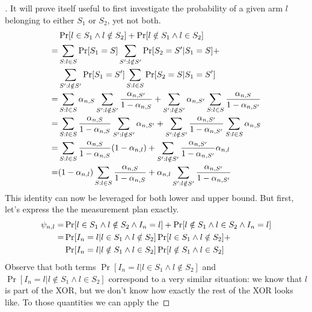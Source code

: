 \begin{proof}[]
  It will prove itself useful to first investigate the probability of a given
  arm $l$ belonging to either $S_1$ or $S_2$, yet not both.
  \begin{align}
    &\Pr[l \in S_1 \wedge l \notin S_2] + \Pr[l \notin S_1 \wedge l \in S_2]  \\
    =& \sum_{S: l \in S} \Pr[S_1 = S] \sum_{S': l \notin S'} \Pr[S_2 = S' | S_1
        = S] + \notag\\
    & \sum_{S': l \notin S'} \Pr[S_1 = S'] \sum_{S: l \in S} \Pr[S_2 = S | S_1
        = S'] \\
    =& \sum_{S: l \in S} \alpha_{n, S} \sum_{S': l \notin S'} \frac{\alpha_{n,
        S'}}{1 - \alpha_{n, S}} + \sum_{S': l \notin S'} \alpha_{n, S'}
        \sum_{S: l \in S} \frac{\alpha_{n, S}}{1 - \alpha_{n, S'}}\\
    =& \sum_{S: l \in S} \frac{\alpha_{n, S}}{1 - \alpha_{n, S}} \sum_{S': l
        \notin S'} \alpha_{n, S'} + \sum_{S': l \notin S'} \frac{\alpha_{n,
        S'}}{1 - \alpha_{n, S'}} \sum_{S: l \in S} \alpha_{n, S}\\
    =& \sum_{S: l \in S} \frac{\alpha_{n, S}}{1 - \alpha_{n, S}} (1 -
        \alpha_{n, l}) +  \sum_{S': l \notin S'} \frac{\alpha_{n, S'}}{1 -
        \alpha_{n, S'}} \alpha_{n, l} \\
    =& (1 - \alpha_{n, l})\sum_{S: l \in S} \frac{\alpha_{n, S}}{1 - \alpha_{n,
        S}} + \alpha_{n, l} \sum_{S': l \notin S'} \frac{\alpha_{n, S'}}{1 -
        \alpha_{n, S'}}
  \end{align}
  This identity can now be leveraged for both lower and upper bound. But first,
  let's express the the measurement plan exactly.
  \begin{align}
    \psi_{n, l} =& \Pr[l \in S_1 \wedge l \notin S_2 \wedge I_n = l] + \Pr[l
        \notin S_1 \wedge l \in S_2 \wedge I_n = l] \\
    =& \Pr[I_n = l | l \in S_1 \wedge l \notin S_2] \Pr[l \in S_1 \wedge l
        \notin S_2] + \notag\\
    & \Pr[I_n = l | l \notin S_1 \wedge l \in S_2] \Pr[l \notin S_1 \wedge l
        \in S_2]
  \end{align}
  Observe that both terms $\Pr[I_n = l | l \in S_1 \wedge l \notin S_2]$ and
  $\Pr[I_n = l | l \notin S_1 \wedge l \in S_2]$ correspond to a very similar
  situation: we know that $l$ is part of the XOR, but we don't know how exactly
  the rest of the XOR looks like. To those quantities we can apply the

\end{proof}
